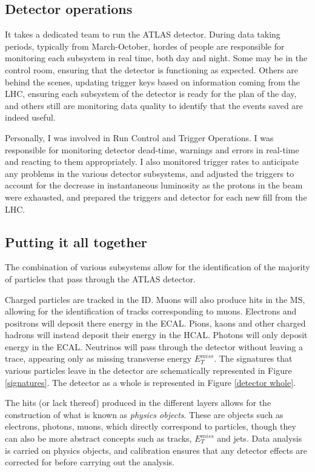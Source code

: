 \documentclass[10pt,a4paper]{book}
\begin{document}
\subsection{Detector operations}
It takes a dedicated team to run the ATLAS detector. During data taking periods, typically from March-October, hordes of people are responsible for monitoring each subsystem in real time, both day and night. Some may be in the control room, ensuring that the detector is functioning as expected. Others are behind the scenes, updating trigger keys based on information coming from the LHC, ensuring each subsystem of the detector is ready for the plan of the day, and others still are monitoring data quality to identify that the events saved are indeed useful.

Personally, I was involved in Run Control and Trigger Operations. I was responsible for monitoring detector dead-time, warnings and errors in real-time and reacting to them appropriately. I also monitored trigger rates to anticipate any problems in the various detector subsystems, and adjusted the triggers to account for the decrease in instantaneous luminosity as the protons in the beam were exhausted, and prepared the triggers and detector for each new fill from the LHC. 

\subsection{Putting it all together}
The combination of various subsystems allow for the identification of the majority of particles that pass through the ATLAS detector.

Charged particles are tracked in the ID. Muons will also produce hits in the MS, allowing for the identification of tracks corresponding to muons. Electrons and positrons will deposit there energy in the ECAL. Pions, kaons and other charged hadrons will instead deposit their energy in the HCAL. Photons will only deposit energy in the ECAL. Neutrinos will pass through the detector without leaving a trace, appearing only as missing transverse energy $E_T^{miss}$. The signatures that various particles leave in the detector are schematically represented in Figure \ref{signatures}. The detector as a whole is represented in Figure \ref{detector whole}. 

The hits (or lack thereof) produced in the different layers allows for the construction of what is known as \emph{physics objects}. These are objects such as electrons, photons, muons, which directly correspond to particles, though they can also be more abstract concepts such as tracks, $E_T^{miss}$ and jets. Data analysis is carried on physics objects, and calibration ensures that any detector effects are corrected for before carrying out the analysis. 
\end{document}
